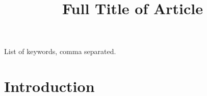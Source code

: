 \documentclass{midl} %
\title[Short Title]{Full Title of Article}
\begin{document}
\maketitle

\begin{abstract}
\blindtext
\end{abstract}

\begin{keywords}
List of keywords, comma separated.
\end{keywords}

\section{Introduction}

\Blindtext[5][2]

\midlacknowledgments{\blindtext}
\end{document}
